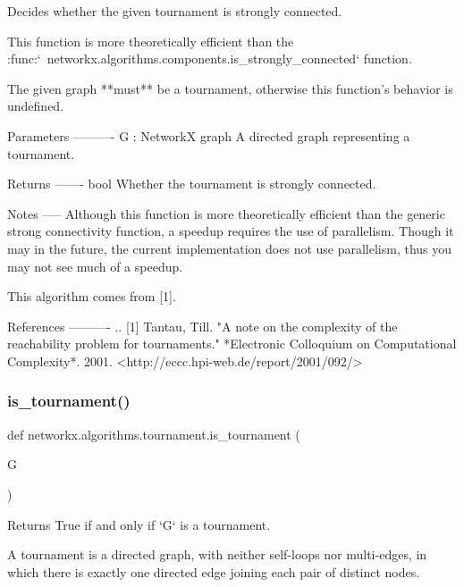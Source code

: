 \begin{DoxyVerb}
\begin{DoxyVerb}Decides whether the given tournament is strongly connected.

This function is more theoretically efficient than the
:func:`~networkx.algorithms.components.is_strongly_connected`
function.

The given graph **must** be a tournament, otherwise this function's
behavior is undefined.

Parameters
----------
G : NetworkX graph
    A directed graph representing a tournament.

Returns
-------
bool
    Whether the tournament is strongly connected.

Notes
-----
Although this function is more theoretically efficient than the
generic strong connectivity function, a speedup requires the use of
parallelism. Though it may in the future, the current implementation
does not use parallelism, thus you may not see much of a speedup.

This algorithm comes from [1].

References
----------
.. [1] Tantau, Till.
       "A note on the complexity of the reachability problem for
       tournaments."
       *Electronic Colloquium on Computational Complexity*. 2001.
       <http://eccc.hpi-web.de/report/2001/092/>\end{DoxyVerb}
 \mbox{\label{namespacenetworkx_1_1algorithms_1_1tournament_ab7af5e6b1f7adca3f88ebdba688bfa32}} 
\subsubsection{\texorpdfstring{is\+\_\+tournament()}{is\_tournament()}}
{\footnotesize\ttfamily def networkx.\+algorithms.\+tournament.\+is\+\_\+tournament (\begin{DoxyParamCaption}\item[{}]{G }\end{DoxyParamCaption})}

\begin{DoxyVerb}Returns True if and only if `G` is a tournament.

A tournament is a directed graph, with neither self-loops nor
multi-edges, in which there is exactly one directed edge joining
each pair of distinct nodes.


\end{DoxyVerb}
\end{DoxyVerb}
